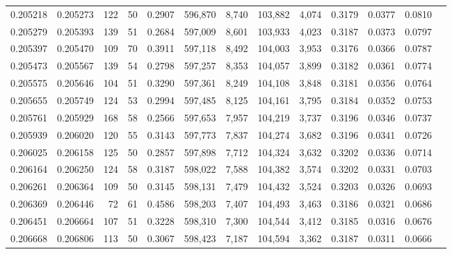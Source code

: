 \begin{tabular}{rrrrrrrrrrrrr}
0.205218 & 0.205273 &   122 &  50 &                                     0.2907 & 596,870 &   8,740 & 103,882 &   4,074 & 0.3179 & 0.0377 & 0.0810 \\
0.205279 & 0.205393 &   139 &  51 &                                     0.2684 & 597,009 &   8,601 & 103,933 &   4,023 & 0.3187 & 0.0373 & 0.0797 \\
0.205397 & 0.205470 &   109 &  70 &                                     0.3911 & 597,118 &   8,492 & 104,003 &   3,953 & 0.3176 & 0.0366 & 0.0787 \\
0.205473 & 0.205567 &   139 &  54 &                                     0.2798 & 597,257 &   8,353 & 104,057 &   3,899 & 0.3182 & 0.0361 & 0.0774 \\
0.205575 & 0.205646 &   104 &  51 &                                     0.3290 & 597,361 &   8,249 & 104,108 &   3,848 & 0.3181 & 0.0356 & 0.0764 \\
0.205655 & 0.205749 &   124 &  53 &                                     0.2994 & 597,485 &   8,125 & 104,161 &   3,795 & 0.3184 & 0.0352 & 0.0753 \\
0.205761 & 0.205929 &   168 &  58 &                                     0.2566 & 597,653 &   7,957 & 104,219 &   3,737 & 0.3196 & 0.0346 & 0.0737 \\
0.205939 & 0.206020 &   120 &  55 &                                     0.3143 & 597,773 &   7,837 & 104,274 &   3,682 & 0.3196 & 0.0341 & 0.0726 \\
0.206025 & 0.206158 &   125 &  50 &                                     0.2857 & 597,898 &   7,712 & 104,324 &   3,632 & 0.3202 & 0.0336 & 0.0714 \\
0.206164 & 0.206250 &   124 &  58 &                                     0.3187 & 598,022 &   7,588 & 104,382 &   3,574 & 0.3202 & 0.0331 & 0.0703 \\
0.206261 & 0.206364 &   109 &  50 &                                     0.3145 & 598,131 &   7,479 & 104,432 &   3,524 & 0.3203 & 0.0326 & 0.0693 \\
0.206369 & 0.206446 &    72 &  61 &                                     0.4586 & 598,203 &   7,407 & 104,493 &   3,463 & 0.3186 & 0.0321 & 0.0686 \\
0.206451 & 0.206664 &   107 &  51 &                                     0.3228 & 598,310 &   7,300 & 104,544 &   3,412 & 0.3185 & 0.0316 & 0.0676 \\
0.206668 & 0.206806 &   113 &  50 &                                     0.3067 & 598,423 &   7,187 & 104,594 &   3,362 & 0.3187 & 0.0311 & 0.0666 \\

\end{tabular}
